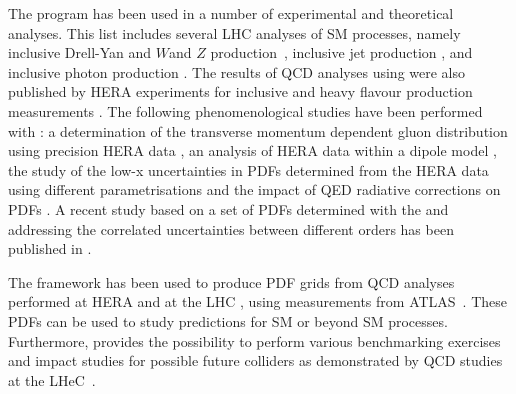 The \fitter program has been used in a number of experimental and theoretical analyses. 
This list includes several LHC analyses of SM processes, namely
inclusive Drell-Yan and $W$and $Z$ production~\cite{atlas:strange,cms:strange,atlas:hm,Aad:2014qja,Aad:2014xca}, 
inclusive jet production \cite{atlas:jets}, and inclusive photon production \cite{atlas:photons}.
The results of QCD analyses using \fitter were also
published by HERA experiments for inclusive \cite{h1zeus:2009wt,h1:2012kk} and
 heavy flavour production measurements \cite{h1zeus:charm, Abramowicz:2014zub}.
The following phenomenological studies have been performed with \fitter:
a determination of the transverse momentum dependent gluon distribution using precision HERA data \cite{Hautmann:2013tba}, 
an analysis of HERA data within a dipole model \cite{Luszczak:2013rxa},
the study of the low-x uncertainties in PDFs determined from the HERA data using 
different parametrisations \cite{Chebyshev} and the impact of QED radiative corrections on PDFs \cite{Sadykov:2014aua}.
A recent study based on a set of PDFs determined with the \fitter and addressing 
the correlated uncertainties between different orders has been published in \cite{hfcorrpaper}. 

The \fitter framework has been used to produce PDF grids from QCD analyses performed at 
HERA \cite{h1zeus:2009wt,hera:grids} and at the LHC \cite{atlas:grids}, using 
measurements from ATLAS~\cite{atlas:strange,atlas:jets}. These PDFs can be used to study predictions for SM 
or beyond SM processes. Furthermore, \fitter provides the possibility to perform various benchmarking exercises
\cite{Butterworth:2014efa} and impact studies for possible future colliders
as demonstrated by QCD studies at the LHeC~\cite{lhec:studies}.









